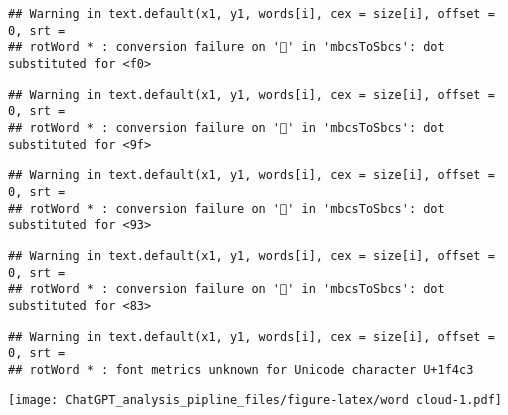 \documentclass[
]{article}
\begin{document}
\begin{verbatim}
## Warning in text.default(x1, y1, words[i], cex = size[i], offset = 0, srt =
## rotWord * : conversion failure on '📃' in 'mbcsToSbcs': dot substituted for <f0>
\end{verbatim}

\begin{verbatim}
## Warning in text.default(x1, y1, words[i], cex = size[i], offset = 0, srt =
## rotWord * : conversion failure on '📃' in 'mbcsToSbcs': dot substituted for <9f>
\end{verbatim}

\begin{verbatim}
## Warning in text.default(x1, y1, words[i], cex = size[i], offset = 0, srt =
## rotWord * : conversion failure on '📃' in 'mbcsToSbcs': dot substituted for <93>
\end{verbatim}

\begin{verbatim}
## Warning in text.default(x1, y1, words[i], cex = size[i], offset = 0, srt =
## rotWord * : conversion failure on '📃' in 'mbcsToSbcs': dot substituted for <83>
\end{verbatim}

\begin{verbatim}
## Warning in text.default(x1, y1, words[i], cex = size[i], offset = 0, srt =
## rotWord * : font metrics unknown for Unicode character U+1f4c3
\end{verbatim}

\texttt{[image: ChatGPT\_analysis\_pipline\_files/figure-latex/word cloud-1.pdf]}
\end{document}
